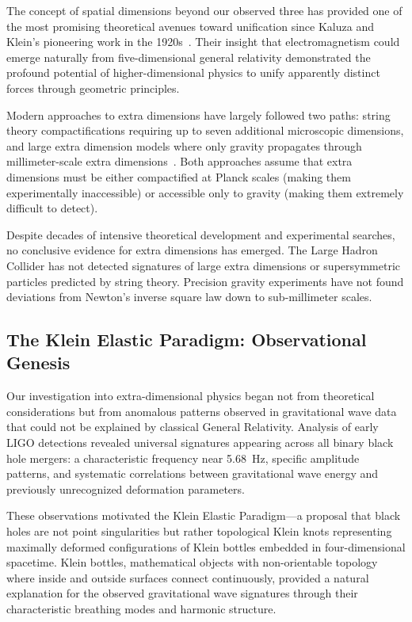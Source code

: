 \documentclass[aps,prl,twocolumn,showpacs,superscriptaddress,groupedaddress]{revtex4-1}
\begin{document}
The concept of spatial dimensions beyond our observed three has provided one of the most promising theoretical avenues toward unification since Kaluza and Klein's pioneering work in the 1920s~\cite{Kaluza1921,Klein1926}. Their insight that electromagnetism could emerge naturally from five-dimensional general relativity demonstrated the profound potential of higher-dimensional physics to unify apparently distinct forces through geometric principles.

Modern approaches to extra dimensions have largely followed two paths: string theory compactifications requiring up to seven additional microscopic dimensions, and large extra dimension models where only gravity propagates through millimeter-scale extra dimensions~\cite{Randall1999,Arkani-Hamed1998}. Both approaches assume that extra dimensions must be either compactified at Planck scales (making them experimentally inaccessible) or accessible only to gravity (making them extremely difficult to detect).

Despite decades of intensive theoretical development and experimental searches, no conclusive evidence for extra dimensions has emerged. The Large Hadron Collider has not detected signatures of large extra dimensions or supersymmetric particles predicted by string theory. Precision gravity experiments have not found deviations from Newton's inverse square law down to sub-millimeter scales.

\subsection{The Klein Elastic Paradigm: Observational Genesis}

Our investigation into extra-dimensional physics began not from theoretical considerations but from anomalous patterns observed in gravitational wave data that could not be explained by classical General Relativity. Analysis of early LIGO detections revealed universal signatures appearing across all binary black hole mergers: a characteristic frequency near \SI{5.68}{\hertz}, specific amplitude patterns, and systematic correlations between gravitational wave energy and previously unrecognized deformation parameters.

These observations motivated the Klein Elastic Paradigm—a proposal that black holes are not point singularities but rather topological Klein knots representing maximally deformed configurations of Klein bottles embedded in four-dimensional spacetime. Klein bottles, mathematical objects with non-orientable topology where inside and outside surfaces connect continuously, provided a natural explanation for the observed gravitational wave signatures through their characteristic breathing modes and harmonic structure.
\end{document}
